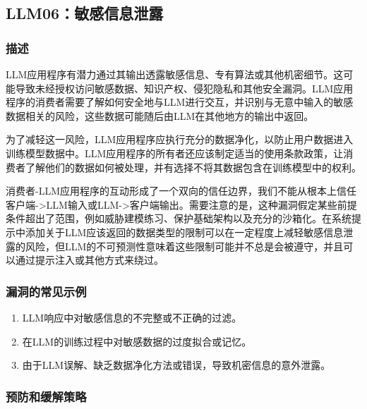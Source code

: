 \documentclass[
]{article}
\author{}
\date{}
\providecommand{\tightlist}{%
  \setlength{\itemsep}{0pt}\setlength{\parskip}{0pt}}
\begin{document}
\subsection{LLM06：敏感信息泄露}\label{llm06ux654fux611fux4fe1ux606fux6cc4ux9732}

\subsubsection{描述}\label{ux63cfux8ff0}

LLM应用程序有潜力通过其输出透露敏感信息、专有算法或其他机密细节。这可能导致未经授权访问敏感数据、知识产权、侵犯隐私和其他安全漏洞。LLM应用程序的消费者需要了解如何安全地与LLM进行交互，并识别与无意中输入的敏感数据相关的风险，这些数据可能随后由LLM在其他地方的输出中返回。

为了减轻这一风险，LLM应用程序应执行充分的数据净化，以防止用户数据进入训练模型数据中。LLM应用程序的所有者还应该制定适当的使用条款政策，让消费者了解他们的数据如何被处理，并有选择不将其数据包含在训练模型中的权利。

消费者-LLM应用程序的互动形成了一个双向的信任边界，我们不能从根本上信任客户端-\textgreater LLM输入或LLM-\textgreater 客户端输出。需要注意的是，这种漏洞假定某些前提条件超出了范围，例如威胁建模练习、保护基础架构以及充分的沙箱化。在系统提示中添加关于LLM应该返回的数据类型的限制可以在一定程度上减轻敏感信息泄露的风险，但LLM的不可预测性意味着这些限制可能并不总是会被遵守，并且可以通过提示注入或其他方式来绕过。

\subsubsection{漏洞的常见示例}\label{ux6f0fux6d1eux7684ux5e38ux89c1ux793aux4f8b}

\begin{enumerate}
\def\labelenumi{\arabic{enumi}.}
\tightlist
\item
  LLM响应中对敏感信息的不完整或不正确的过滤。
\item
  在LLM的训练过程中对敏感数据的过度拟合或记忆。
\item
  由于LLM误解、缺乏数据净化方法或错误，导致机密信息的意外泄露。
\end{enumerate}

\subsubsection{预防和缓解策略}\label{ux9884ux9632ux548cux7f13ux89e3ux7b56ux7565}
\end{document}
